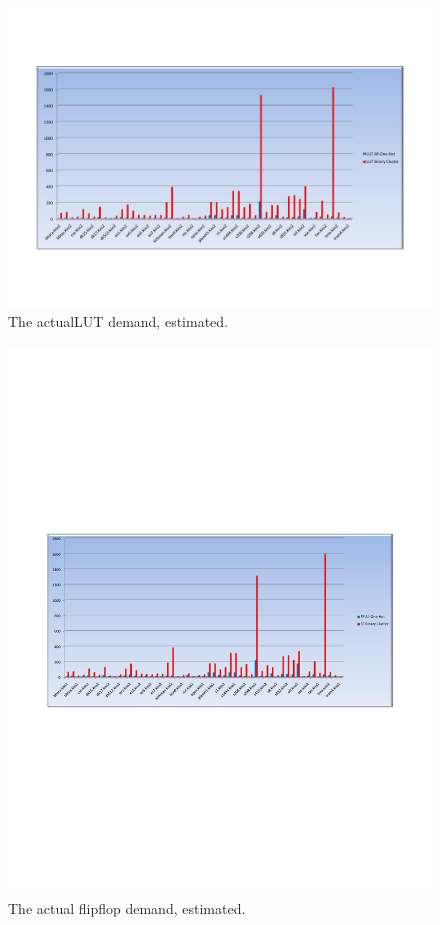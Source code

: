 \begin{figure}[ht]
\centering
\includegraphics[scale=0.6]{images/output2_praktik.pdf}
\caption{The actualLUT demand, estimated.}
\label{fig:practical1}
\end{figure}
\begin{figure}[ht]
\centering
\includegraphics[scale=0.8]{images/output2_praktik_FF.pdf}
\caption{The actual flipflop demand, estimated.}
\label{fig:practical2}
\end{figure}



